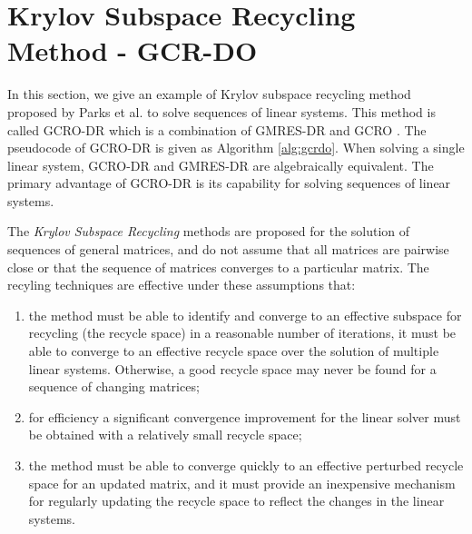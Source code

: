 \section{Krylov Subspace Recycling Method - GCR-DO}

In this section, we give an example of Krylov subspace recycling method proposed by Parks et al. \cite{parks2006recycling} to solve sequences of linear systems. This method is called GCRO-DR which is a combination of GMRES-DR and GCRO \cite{de1996nested}. The pseudocode of GCRO-DR is given as Algorithm \ref{alg:gcrdo}. When solving a single linear system, GCRO-DR and GMRES-DR are algebraically equivalent. The primary advantage of GCRO-DR is its capability for solving sequences of linear systems.

The \textit{Krylov Subspace Recycling} methods are proposed for the solution of sequences of general matrices, and do not assume that all matrices are pairwise close or that the sequence of matrices converges to a particular matrix. The recyling techniques are effective under these assumptions that: 
\begin{enumerate}[label=(\arabic*)]
	\item  the method must be able to identify and converge to an effective subspace for recycling (the recycle space) in a reasonable number of iterations, it must be able to converge to an effective recycle space over the solution of multiple linear systems. Otherwise, a good recycle space may never be found for a sequence of changing matrices;
	\item for efficiency a significant convergence improvement for the linear solver must be obtained with a relatively small recycle space;
	\item the method must be able to converge quickly to an effective perturbed recycle space for an updated matrix, and it must provide an inexpensive mechanism for regularly updating the recycle space to reflect the changes in the linear systems.
\end{enumerate}

